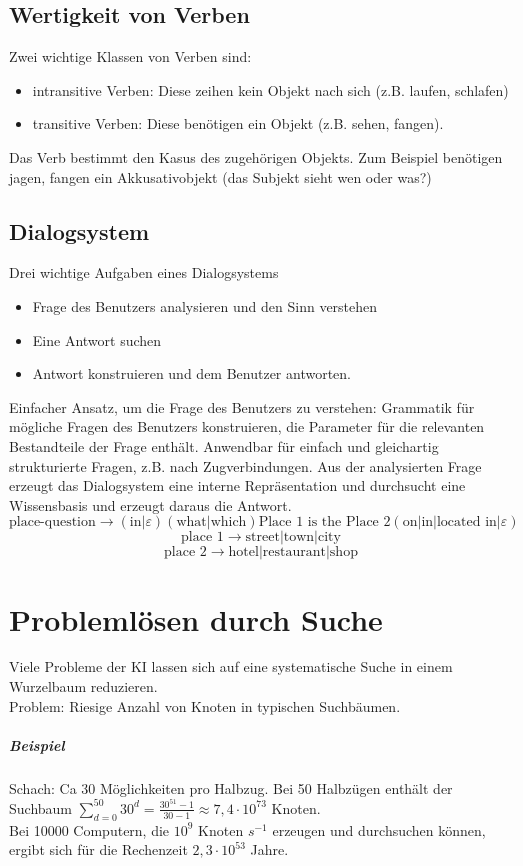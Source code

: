 \documentclass[a4paper]{scrartcl}
\begin{document}
\subsection{Wertigkeit von Verben}
Zwei wichtige Klassen von Verben sind:
\begin{itemize}
\item intransitive Verben: Diese zeihen kein Objekt nach sich (z.B. laufen, schlafen)
\item transitive Verben: Diese benötigen ein Objekt (z.B. sehen, fangen).
\end{itemize}
Das Verb bestimmt den Kasus des zugehörigen Objekts. Zum Beispiel benötigen jagen, fangen ein Akkusativobjekt (das Subjekt sieht wen oder was?)
\subsection{Dialogsystem}
Drei wichtige Aufgaben eines Dialogsystems
\begin{itemize}
\item Frage des Benutzers analysieren und den Sinn verstehen
\item Eine Antwort suchen
\item Antwort konstruieren und dem Benutzer antworten.
\end{itemize}
Einfacher Ansatz, um die Frage des Benutzers zu verstehen: Grammatik für mögliche Fragen des Benutzers konstruieren, die Parameter für die relevanten Bestandteile der Frage enthält. Anwendbar für einfach und gleichartig strukturierte Fragen, z.B. nach Zugverbindungen.
Aus der analysierten Frage erzeugt das Dialogsystem eine interne Repräsentation und durchsucht eine Wissensbasis und erzeugt daraus die Antwort.
\[ \text{place-question} \rightarrow (\text{in} | \varepsilon ) (\text{what} | \text{which} ) \text{Place 1 is the Place 2} (\text{on} | \text{in} | \text{located in} | \varepsilon ) \]
\[ \text{place 1} \rightarrow \text{street} | \text{town} | \text{city} \]
\[ \text{place 2} \rightarrow \text{hotel} | \text{restaurant} | \text{shop} \]

\section{Problemlösen durch Suche}
Viele Probleme der KI lassen sich auf eine systematische Suche in einem Wurzelbaum reduzieren.\\
Problem: Riesige Anzahl von Knoten in typischen Suchbäumen.
\subparagraph{Beispiel} Schach: Ca 30 Möglichkeiten pro Halbzug. Bei 50 Halbzügen enthält der Suchbaum $\sum\limits_{d=0}^{50} 30^d = \frac{30^{51}-1}{30-1} \approx 7,4 \cdot 10^{73}$ Knoten.\\
Bei 10000 Computern, die $10^9$ Knoten $s^{-1}$ erzeugen und durchsuchen können, ergibt sich für die Rechenzeit $2,3 \cdot 10^{53}$ Jahre.
\end{document}
